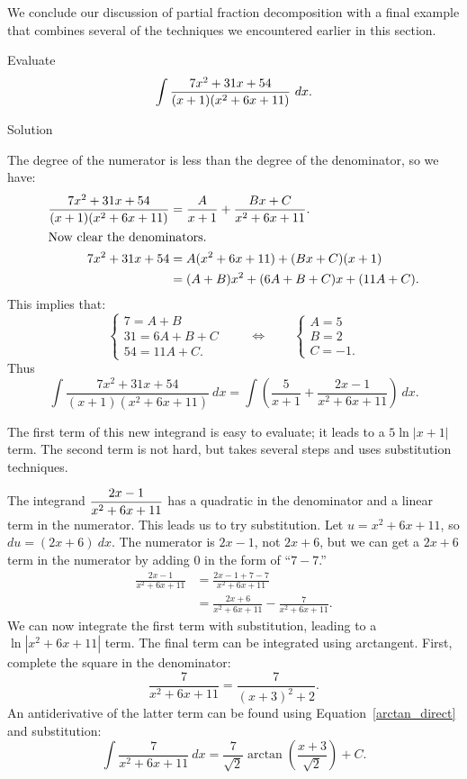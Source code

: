 We conclude our discussion of partial fraction decomposition with a final example that combines several of the techniques we encountered earlier in this section. 

\begin{example}\label{ex_pf5}
Evaluate $$\ds \int\frac{7x^2+31x+54}{(x+1)(x^2+6x+11)}\ dx.$$

Solution 

The degree of the numerator is less than the degree of the denominator, so we have:
\begin{align*}
\frac{7x^2+31x+54}{(x+1)(x^2+6x+11)} &= \frac{A}{x+1} + \frac{Bx+C}{x^2+6x+11}. \\
\intertext{Now clear the denominators.}
7x^2+31x+54 &= A(x^2+6x+11) + (Bx+C)(x+1)\\
					&= (A+B)x^2 + (6A+B+C)x + (11A+C).
\end{align*}
This implies that:
$$
\begin{cases*}
				7=A+B\\
				31 = 6A+B+C\\
				54 = 11A+C.
\end{cases*}
\qquad\Leftrightarrow\qquad
\begin{cases*}
				A=5\\
				B= 2\\
				C = -1.
\end{cases*}
$$
Thus
$$\int\frac{7x^2+31x+54}{(x+1)(x^2+6x+11)}\ dx = \int\left(\frac{5}{x+1} + \frac{2x-1}{x^2+6x+11}\right)\ dx.$$

The first term of this new integrand is easy to evaluate; it leads to a $5\ln|x+1|$ term. The second term is not hard, but takes several steps and uses substitution techniques.

The integrand $\displaystyle \frac{2x-1}{x^2+6x+11}$ has a quadratic in the denominator and a linear term in the numerator. This leads us to try substitution. Let $u = x^2+6x+11$, so $du = (2x+6)\ dx$. The numerator is $2x-1$, not $2x+6$, but we can get a $2x+6$ term in the numerator by adding 0 in the form of ``$7-7$.''
\begin{align*}
\frac{2x-1}{x^2+6x+11} &= \frac{2x-1+7-7}{x^2+6x+11} \\[0.2cm]
					&= \frac{2x+6}{x^2+6x+11} - \frac{7}{x^2+6x+11}.
\end{align*}
We can now integrate the first term with substitution, leading to a $\ln|x^2+6x+11|$ term. The final term can be integrated using arctangent. First, complete the square in the denominator:
$$\frac{7}{x^2+6x+11} = \frac{7}{(x+3)^2+2}.$$
An antiderivative of the latter term can be found using Equation~\eqref{arctan_direct} and substitution:
$$\int \frac{7}{x^2+6x+11}\ dx = \frac{7}{\sqrt{2}}\arctan\left(\frac{x+3}{\sqrt{2}}\right)+C.$$


\end{example}
